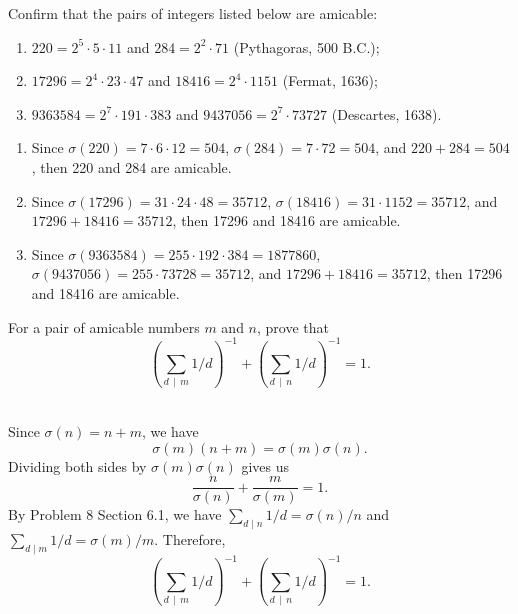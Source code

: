 \begin{exercise}
    Confirm that the pairs of integers listed below are amicable:
    \begin{enumerate}
        \item $220 = 2^5 \cdot 5 \cdot 11$ and $284 = 2^2 \cdot 71$ (Pythagoras, 500 B.C.);
        \item $17296 = 2^4 \cdot 23 \cdot 47$ and $18416 = 2^4 \cdot 1151$ (Fermat, 1636);
        \item $9363584 = 2^7 \cdot 191 \cdot 383$ and $9437056 = 2^7 \cdot 73727$ (Descartes, 1638). \\
    \end{enumerate}
\end{exercise}

\begin{solution}
    \begin{enumerate}
        \item Since $\sigma(220) = 7\cdot 6 \cdot 12 = 504$, $\sigma(284) = 7 \cdot 72 = 504$, and $220 + 284 = 504$, then 220 and 284 are amicable.
        \item Since $\sigma(17296) = 31\cdot 24 \cdot 48 = 35712$, $\sigma(18416) = 31\cdot 1152 = 35712$, and $17296 + 18416 = 35712$, then 17296 and 18416 are amicable.
        \item Since $\sigma(9363584) = 255\cdot 192 \cdot 384 = 1877860$, $\sigma(9437056) = 255\cdot 73728 = 35712$, and $17296 + 18416 = 35712$, then 17296 and 18416 are amicable. \\
    \end{enumerate}
\end{solution}

\begin{exercise}
    For a pair of amicable numbers $m$ and $n$, prove that
    $$\left(\sum_{d \, \mid \, m}1/d\right)^{-1} + \left(\sum_{d \, \mid \, n}1/d\right)^{-1} = 1.$$ \\
\end{exercise}

\begin{solution}
    Since $\sigma(n) = n+m$, we have
    $$\sigma(m)(n+m) = \sigma(m)\sigma(n).$$
    Dividing both sides by $\sigma(m)\sigma(n)$ gives us 
    $$\frac{n}{\sigma(n)} + \frac{m}{\sigma(m)} = 1.$$
    By Problem 8 Section 6.1, we have $\sum_{d \mid n}1/d = \sigma(n)/n$ and $\sum_{d \mid m}1/d = \sigma(m)/m$. Therefore, 
    $$\left(\sum_{d \, \mid \, m}1/d\right)^{-1} + \left(\sum_{d \, \mid \, n}1/d\right)^{-1} = 1.$$ \\
\end{solution}

